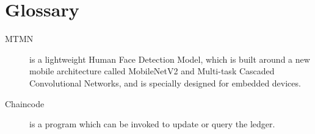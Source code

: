\chapter*{Glossary}






\begin{description}
  \item[MTMN] is a lightweight Human Face Detection Model, which is built around a new mobile architecture called MobileNetV2 and Multi-task Cascaded Convolutional Networks, and is specially designed for embedded devices.
 \item[Chaincode] is a program which can be invoked to update or query the ledger.
 
\end{description}
